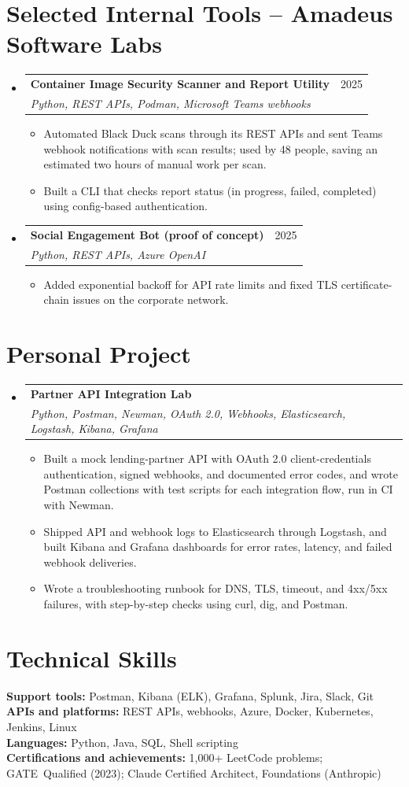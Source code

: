 \documentclass[a4paper,11pt]{article}
\makeatletter
\newcommand{\entry}[4]{\item\begin{tabularx}{\textwidth}{@{}Xr@{}}\textbf{#1}& #2\\\textit{\small #3}&\textit{\small #4}\end{tabularx}\vspace{-5pt}}
\newcommand{\bulletpoint}[1]{\item\small{#1}}
\makeatother
\begin{document}
\section{Selected Internal Tools -- Amadeus Software Labs}
\begin{itemize}[leftmargin=0in,label={}]
  \entry{Container Image Security Scanner and Report Utility}{2025}{Python, REST APIs, Podman, Microsoft Teams webhooks}{}
  \begin{itemize}
    \bulletpoint{Automated Black Duck scans through its REST APIs and sent Teams webhook notif{}ications with scan results; used by 48 people, saving an estimated two hours of manual work per scan.}
    \bulletpoint{Built a CLI that checks report status (in progress, failed, completed) using conf{}ig-based authentication.}
  \end{itemize}
  \entry{Social Engagement Bot (proof of concept)}{2025}{Python, REST APIs, Azure OpenAI}{}
  \begin{itemize}
    \bulletpoint{Added exponential backof{}f for API rate limits and f{}ixed TLS certif{}icate-chain issues on the corporate network.}
  \end{itemize}
\end{itemize}

\section{Personal Project}
\begin{itemize}[leftmargin=0in,label={}]
  \entry{Partner API Integration Lab}{}{Python, Postman, Newman, OAuth 2.0, Webhooks, Elasticsearch, Logstash, Kibana, Grafana}{}
  \begin{itemize}
    \bulletpoint{Built a mock lending-partner API with OAuth 2.0 client-credentials authentication, signed webhooks, and documented error codes, and wrote Postman collections with test scripts for each integration f{}low, run in CI with Newman.}
    \bulletpoint{Shipped API and webhook logs to Elasticsearch through Logstash, and built Kibana and Grafana dashboards for error rates, latency, and failed webhook deliveries.}
    \bulletpoint{Wrote a troubleshooting runbook for DNS, TLS, timeout, and 4xx/5xx failures, with step-by-step checks using curl, dig, and Postman.}
  \end{itemize}
\end{itemize}

\section{Technical Skills}
\small\textbf{Support tools:} Postman, Kibana (ELK), Grafana, Splunk, Jira, Slack, Git \\
\textbf{APIs and platforms:} REST APIs, webhooks, Azure, Docker, Kubernetes, Jenkins, Linux \\
\textbf{Languages:} Python, Java, SQL, Shell scripting \\
\textbf{Certif{}ications and achievements:} 1,000+ LeetCode problems; \mbox{GATE Qualif{}ied} (2023); Claude \mbox{Certif{}ied} Architect, Foundations (Anthropic)
\end{document}
